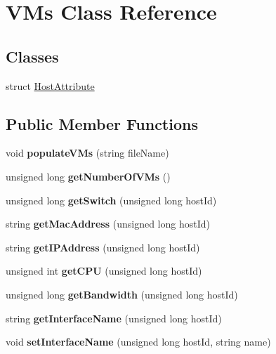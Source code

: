 \hypertarget{classVMs}{\section{\-V\-Ms \-Class \-Reference}
\label{classVMs}
}
\subsection*{\-Classes}
\begin{DoxyCompactItemize}
\item 
struct \hyperlink{structVMs_1_1HostAttribute}{\-Host\-Attribute}
\end{DoxyCompactItemize}
\subsection*{\-Public \-Member \-Functions}
\begin{DoxyCompactItemize}
\item 
\hypertarget{classVMs_ae464fddb0aaee311f7142bebba0242f8}{void {\bfseries populate\-V\-Ms} (string file\-Name)}\label{classVMs_ae464fddb0aaee311f7142bebba0242f8}

\item 
\hypertarget{classVMs_ae5f3d8c8673a3d764c9ecf448981ad05}{unsigned long {\bfseries get\-Number\-Of\-V\-Ms} ()}\label{classVMs_ae5f3d8c8673a3d764c9ecf448981ad05}

\item 
\hypertarget{classVMs_a35a62ddcd3188f5efaddb40d65da46a4}{unsigned long {\bfseries get\-Switch} (unsigned long host\-Id)}\label{classVMs_a35a62ddcd3188f5efaddb40d65da46a4}

\item 
\hypertarget{classVMs_a496b0710d2ed0a95ae9ff293d0bc4344}{string {\bfseries get\-Mac\-Address} (unsigned long host\-Id)}\label{classVMs_a496b0710d2ed0a95ae9ff293d0bc4344}

\item 
\hypertarget{classVMs_af1ad060e7b42a1d3c96dca47447d6ed4}{string {\bfseries get\-I\-P\-Address} (unsigned long host\-Id)}\label{classVMs_af1ad060e7b42a1d3c96dca47447d6ed4}

\item 
\hypertarget{classVMs_ad296c74b96c46dfe48e0c27ee3856dad}{unsigned int {\bfseries get\-C\-P\-U} (unsigned long host\-Id)}\label{classVMs_ad296c74b96c46dfe48e0c27ee3856dad}

\item 
\hypertarget{classVMs_afd53742f52be824c736df23fbfa7ac72}{unsigned long {\bfseries get\-Bandwidth} (unsigned long host\-Id)}\label{classVMs_afd53742f52be824c736df23fbfa7ac72}

\item 
\hypertarget{classVMs_ae98346260815dd5ea7797a1b924bdbeb}{string {\bfseries get\-Interface\-Name} (unsigned long host\-Id)}\label{classVMs_ae98346260815dd5ea7797a1b924bdbeb}

\item 
\hypertarget{classVMs_a2e2bfe2123a71eb287a0f27d96883468}{void {\bfseries set\-Interface\-Name} (unsigned long host\-Id, string name)}\label{classVMs_a2e2bfe2123a71eb287a0f27d96883468}

\end{DoxyCompactItemize}

